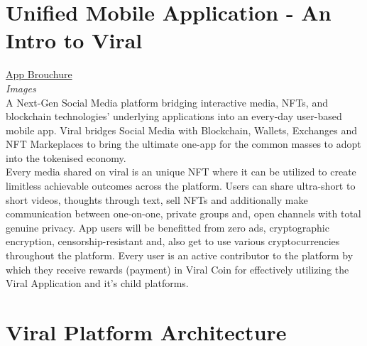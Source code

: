 \documentclass[10pt]{article}
\begin{document}
\section{Unified Mobile Application - An Intro to Viral}

\hyperlink{https://sample.com}{App Brouchure}\\

\textit{Images}\\

A Next-Gen Social Media platform bridging interactive media, NFTs, and blockchain technologies' underlying applications into an every-day user-based mobile app. Viral bridges Social Media with Blockchain, Wallets, Exchanges and NFT Markeplaces to bring the ultimate one-app for the common masses to adopt into the tokenised economy.\\

Every media shared on viral is an unique NFT where it can be utilized to create limitless achievable outcomes across the platform. Users can share ultra-short to short videos, thoughts through text, sell NFTs and additionally make communication between one-on-one, private groups and, open channels with total genuine privacy. App users will be benefitted from zero ads, cryptographic encryption, censorship-resistant and, also get to use various cryptocurrencies throughout the platform. Every user is an active contributor to the platform by which they receive rewards (payment) in Viral Coin for effectively utilizing the Viral Application and it's child platforms.\\

\section{Viral Platform Architecture}
\end{document}
